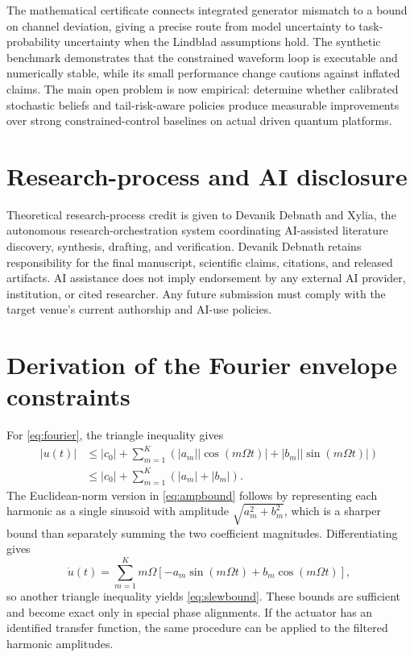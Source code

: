 \documentclass[10pt,twoside]{article}
\begin{document}
The mathematical certificate connects integrated generator mismatch to a bound on channel deviation, giving a precise route from model uncertainty to task-probability uncertainty when the Lindblad assumptions hold. The synthetic benchmark demonstrates that the constrained waveform loop is executable and numerically stable, while its small performance change cautions against inflated claims. The main open problem is now empirical: determine whether calibrated stochastic beliefs and tail-risk-aware policies produce measurable improvements over strong constrained-control baselines on actual driven quantum platforms.

\section*{Research-process and AI disclosure}

Theoretical research-process credit is given to Devanik Debnath and Xylia, the autonomous research-orchestration system coordinating AI-assisted literature discovery, synthesis, drafting, and verification. Devanik Debnath retains responsibility for the final manuscript, scientific claims, citations, and released artifacts. AI assistance does not imply endorsement by any external AI provider, institution, or cited researcher. Any future submission must comply with the target venue's current authorship and AI-use policies.

\appendix
\section{Derivation of the Fourier envelope constraints}

For \cref{eq:fourier}, the triangle inequality gives
\begin{align}
|u(t)|&\leq|c_0|+\sum_{m=1}^{K}\left(|a_m||\cos(m\Omega t)|+|b_m||\sin(m\Omega t)|\right)\\
&\leq |c_0|+\sum_{m=1}^{K}(|a_m|+|b_m|).
\end{align}
The Euclidean-norm version in \cref{eq:ampbound} follows by representing each harmonic as a single sinusoid with amplitude $\sqrt{a_m^2+b_m^2}$, which is a sharper bound than separately summing the two coefficient magnitudes. Differentiating gives
\begin{equation}
\dot u(t)=\sum_{m=1}^{K}m\Omega\left[-a_m\sin(m\Omega t)+b_m\cos(m\Omega t)\right],
\end{equation}
so another triangle inequality yields \cref{eq:slewbound}. These bounds are sufficient and become exact only in special phase alignments. If the actuator has an identified transfer function, the same procedure can be applied to the filtered harmonic amplitudes.
\end{document}

